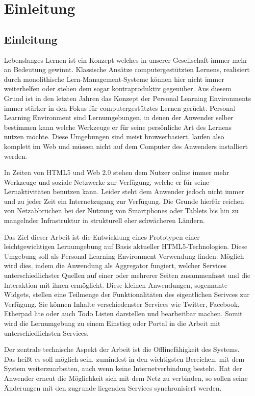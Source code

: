 \chapter{Einleitung} 
\label{chapter:Kapitel1}
\section{Einleitung}
Lebenslanges Lernen ist ein Konzept welches in unserer Gesellschaft immer mehr an Bedeutung gewinnt. Klassische Ansätze computergestützten Lernens, realisiert durch monolithische Lern-Management-Systeme können hier nicht immer weiterhelfen oder stehen dem sogar kontraproduktiv gegenüber. Aus diesem Grund ist in den letzten Jahren das Konzept der Personal Learning Environments immer stärker in den Fokus für computergestütztes Lernen gerückt. Personal Learning Environment sind Lernumgebungen, in denen der Anwender selber bestimmen kann welche Werkzeuge er für seine persönliche Art des Lernens nutzen möchte. Diese Umgebungen sind meist browserbasiert, laufen also komplett im Web und müssen nicht auf dem Computer des Anwenders installiert werden. 

In Zeiten von HTML5 und Web 2.0 stehen dem Nutzer online immer mehr Werkzeuge und soziale Netzwerke zur Verfügung, welche er für seine Lernaktivitäten benutzen kann. Leider steht dem Anwender jedoch nicht immer und zu jeder Zeit ein Internetzugang zur Verfügung. Die Grunde hierfür reichen von Netzabbrüchen bei der Nutzung von Smartphones oder Tablets bis hin zu mangelnder Infrastruktur in strukturell eher schwächeren Ländern.

Das Ziel dieser Arbeit ist die Entwicklung eines Prototypen einer leichtgewichtigen Lernumgebung auf Basis aktueller HTML5-Technologien. Diese Umgebung soll als Personal Learning Environment Verwendung finden. Möglich wird dies, indem die Anwendung als Aggregator fungiert, welcher Services unterschiedlichster Quellen auf einer oder mehrerer Seiten zusammenfasst und die Interaktion mit ihnen ermöglicht. Diese kleinen Anwendungen, sogennante Widgets, stellen eine Teilmenge der Funktionalitäten des eigentlichen Serivces zur Verfügung. Sie können Inhalte verschiedenster Services wie Twitter, Facebook, Etherpad lite oder auch Todo Listen darstellen und bearbeitbar machen. Somit wird die Lernumgebung zu einem Einstieg oder Portal in die Arbeit mit unterschiedlichsten Services. 

Der zentrale technische Aspekt der Arbeit ist die Offlinefähigkeit des Systems. Das heißt es soll möglich sein, zumindest in den wichtigsten Bereichen, mit dem System weiterzuarbeiten, auch wenn keine Internetverbindung besteht. Hat der Anwender erneut die Möglichkeit sich mit dem Netz zu verbinden, so sollen seine Änderungen mit den zugrunde liegenden Services synchronisiert werden.

